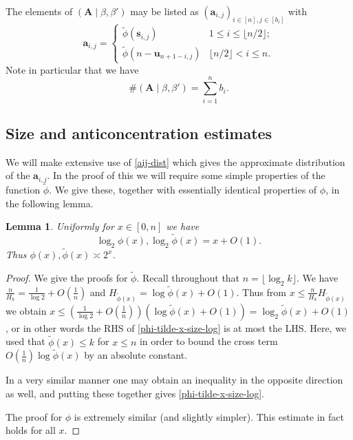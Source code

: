 \documentclass[11pt,reqno]{amsart}
\numberwithin{equation}{section}
\newtheorem{lemma}[theorem]{Lemma}
\theoremstyle{definition}
\theoremstyle{remark}
\newcommand{\mbf}{\mathbf}
\renewcommand{\le}{\leqslant}
\begin{document}
The elements of $(\mbf{A} \mid \beta,\beta')$  may be listed as $(\mbf{a}_{i,j})_{i \in [n], j \in [b_i]}$ with
\begin{equation}\label{a-list} \mbf{a}_{i,j} = \left\{\begin{array}{ll}  \tilde\phi(\mbf{s}_{i,j}) &   1 \le i \le \lfloor n/2\rfloor; \\ \tilde\phi(n - \mbf{u}_{n + 1 - i,j}) & \lfloor n/2\rfloor < i \le n. \end{array}\right.   \end{equation}
Note in particular that we have 
\begin{equation}\label{a-size-2} \# (\mbf{A} \mid \beta,\beta') = \sum_{i = 1}^n b_i.\end{equation}


\subsection{Size and anticoncentration estimates}

We will make extensive use of \cref{aij-dist} which gives the approximate distribution of the $\mbf{a}_{i,j}$. In the proof of this we will require some simple properties of the function $\tilde\phi$. We give these, together with essentially identical properties of $\phi$, in the following lemma.

\begin{lemma}\label{lemma53}
Uniformly for $x \in [0,n]$ we have
\begin{equation}\label{phi-tilde-x-size-log} \log_2 \phi(x),\log_2 \tilde\phi(x) = x + O(1).\end{equation}    Thus $\phi(x), \tilde\phi(x) \asymp 2^x$.
\end{lemma}
\begin{proof}
We give the proofs for $\tilde\phi$. Recall throughout that $n = \lfloor \log_2 k \rfloor$. We have $\frac{n}{H_k} = \frac{1}{\log 2} + O(\frac{1}{n})$ and $H_{\tilde{\phi}(x)} = \log \tilde\phi(x) + O(1)$. Thus from $x \le \frac{n}{H_k} H_{\tilde\phi(x)}$ we obtain $x \le (\frac{1}{\log 2} + O(\frac{1}{n}))(\log \tilde\phi(x) + O(1)) = \log_2 \tilde\phi(x) + O(1)$, or in other words the RHS of \cref{phi-tilde-x-size-log} is at most the LHS. Here, we used that $\tilde\phi(x) \le k$ for $x \le n$ in order to bound the cross term $O(\frac{1}{n}) \log \tilde\phi(x)$ by an absolute constant.

In a very similar manner one may obtain an inequality in the opposite direction as well, and putting these together gives \cref{phi-tilde-x-size-log}.

The proof for $\phi$ is extremely similar (and slightly simpler). This estimate in fact holds for all $x$.
\end{proof}
\end{document}
